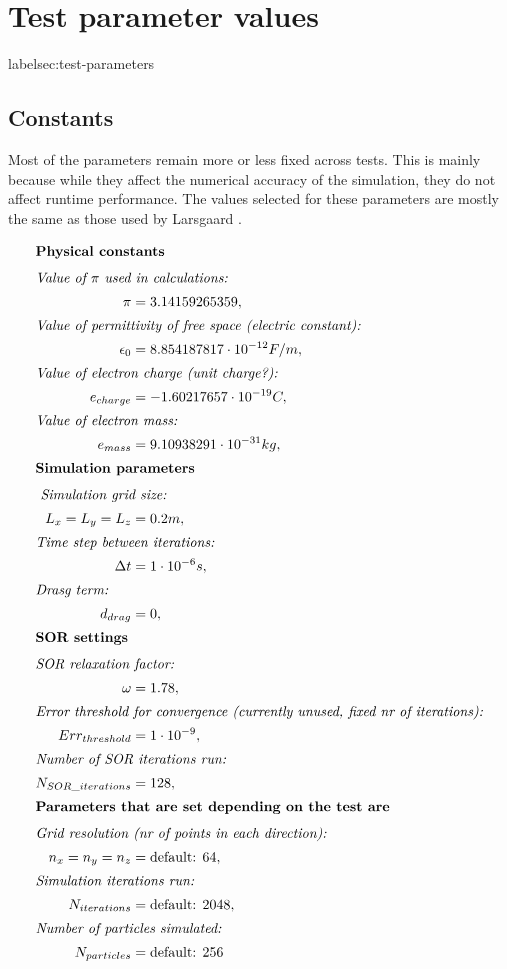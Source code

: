 \section{Test parameter values}
label{sec:test-parameters}
\subsection{Constants}
Most of the parameters remain more or less fixed across tests. This is mainly because while they affect the numerical
accuracy of the simulation, they do not affect runtime performance. The values selected for these parameters are mostly
the same as those used by Larsgaard \cite{larsgaard}.

\begin{align*}
\intertext{\textbf{Physical constants}}
	\intertext{\textit{Value of $\pi$ used in calculations:}}
		\pi &= 3.14159265359,\\
	\intertext{\textit{Value of permittivity of free space (electric constant):}}
		\epsilon_0 &= 8.854187817 \cdot 10^{-12 } F/m,\\
	\intertext{\textit{Value of electron charge (unit charge?):}}
		e_{charge} &= -1.60217657 \cdot 10^{-19 } C,\\
	\intertext{\textit{Value of electron mass:}}
		e_{mass} &= 9.10938291 \cdot 10^{-31 } kg,\\
\intertext{\textbf{Simulation parameters}}
	\intertext{\textit{ Simulation grid size:}}
		L_x = L_y = L_z &= 0.2 m,\\
	\intertext{\textit{Time step between iterations:}}
		\Delta t &= 1 \cdot 10^{-6 } s,\\
	\intertext{\textit{Drasg term:}}
		d_{drag} &= 0,\\
\intertext{\textbf{SOR settings}}
	\intertext{\textit{SOR relaxation factor:}}
		\omega &= 1.78,\\
	\intertext{\textit{Error threshold for convergence (currently unused, fixed nr of iterations):}}
		Err_{threshold} &= 1 \cdot 10^{-9},\\
	\intertext{\textit{Number of SOR iterations run:}}
		N_{SOR\_iterations} &= 128,\\
\intertext{\textbf{Parameters that are set depending on the test are}}
	\intertext{\textit{Grid resolution (nr of points in each direction):}}
		n_x = n_y = n_z &= \text{default: } 64,\\
	\intertext{\textit{Simulation iterations run:}}
		N_{iterations} &= \text{default: } 2048,\\
	\intertext{\textit{Number of particles simulated:}}
		N_{particles} &= \text{default: } 256
\end{align*}

